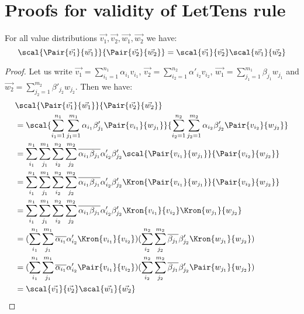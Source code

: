 
\appendix
\section{Proofs for validity of LetTens rule}
\begin{proposition}\label{prop:InnerProdPairs} For all value distributions $\vec{v_1}, \vec{v_2}, \vec{w_1}, \vec{w_2}$ we have:
\[
\scal{\Pair{\vec{v_1}}{\vec{w_1}}}{\Pair{\vec{v_2}}{\vec{w_2}}} = \scal{\vec{v_1}}{\vec{v_2}}\scal{\vec{w_1}}{\vec{w_2}}
\]
\begin{proof}
    Let us write $\vec{v_1}=\sum_{i_1=1}^{n_1}\alpha_{i_1} v_{i_1}$, $\vec{v_2}=\sum_{i_2=1}^{n_2}\alpha'_{i_2} v_{i_2}$, $\vec{w_1}=\sum_{j_1=1}^{m_1}\beta_{j_1} w_{j_1}$ and $\vec{w_2}=\sum_{j_2=1}^{m_2}\beta'_{j_2} w_{j_2}$. Then we have:
    \begin{align*}
        &\scal{\Pair{\vec{v_1}}{\vec{w_1}}}{\Pair{\vec{v_2}}{\vec{w_2}}}\\
        &=\scal{\sum_{i_1=1}^{n_1}\sum_{j_1=1}^{m_1} \alpha_{i_1}\beta'_{j_1}\Pair{v_{i_1}}{w_{j_1}}}{\sum_{i_2=1}^{n_2}\sum_{j_2=1}^{m_2} \alpha_{i_2}\beta'_{j_2}\Pair{v_{i_2}}{w_{j_2}}}\\
        &=\sum_{i_1}^{n_1}\sum_{j_1}^{m_1}\sum_{i_2}^{n_2}\sum_{j_2}^{m_2} \overline{\alpha_{i_1}\beta_{j_1}} \alpha'_{i_2}\beta'_{j_2} \scal{\Pair{v_{i_1}}{w_{j_1}}}{\Pair{v_{i_2}}{w_{j_2}}}\\
        &=\sum_{i_1}^{n_1}\sum_{j_1}^{m_1}\sum_{i_2}^{n_2}\sum_{j_2}^{m_2} \overline{\alpha_{i_1}\beta_{j_1}} \alpha'_{i_2}\beta'_{j_2} \Kron{\Pair{v_{i_1}}{w_{j_1}}}{\Pair{v_{i_2}}{w_{j_2}}}\\
        &=\sum_{i_1}^{n_1}\sum_{j_1}^{m_1}\sum_{i_2}^{n_2}\sum_{j_2}^{m_2} \overline{\alpha_{i_1}\beta_{j_1}} \alpha'_{i_2}\beta'_{j_2} \Kron{v_{i_1}}{v_{i_2}}\Kron{w_{j_1}}{w_{j_2}}\\
        &=(\sum_{i_1}^{n_1}\sum_{j_1}^{m_1}\overline{\alpha_{i_1}}\alpha'_{i_2}\Kron{v_{i_1}}{v_{i_2}})(\sum_{i_2}^{n_2}\sum_{j_2}^{m_2} \overline{\beta_{j_1}} \beta'_{j_2} \Kron{w_{j_1}}{w_{j_2}})\\
        &=(\sum_{i_1}^{n_1}\sum_{j_1}^{m_1}\overline{\alpha_{i_1}}\alpha'_{i_2}\Pair{v_{i_1}}{v_{i_2}})(\sum_{i_2}^{n_2}\sum_{j_2}^{m_2} \overline{\beta_{j_1}} \beta'_{j_2} \Pair{w_{j_1}}{w_{j_2}})\\
        &=\scal{\vec{v_1}}{\vec{v_2}}\scal{\vec{w_1}}{\vec{w_2}}\\
    \end{align*}
\end{proof}  

\end{proposition}

